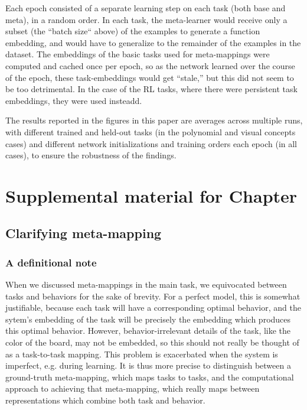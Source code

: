 Each epoch consisted of a separate learning step on each task (both base and meta), in a random order. In each task, the meta-learner would receive only a subset (the ``batch size`` above) of the examples to generate a function embedding, and would have to generalize to the remainder of the examples in the dataset. The embeddings of the basic tasks used for meta-mappings were computed and cached once per epoch, so as the network learned over the course of the epoch, these task-embeddings would get ``stale,'' but this did not seem to be too detrimental. In the case of the RL tasks, where there were persistent task embeddings, they were used insteadd.\par
The results reported in the figures in this paper are averages across multiple runs, with different trained and held-out tasks (in the polynomial and visual concepts cases) and different network initializations and training orders each epoch (in all cases), to ensure the robustness of the findings. \par



\chapter{Supplemental material for Chapter } \label{appendix:zero_shot_via_homm}

\section{Clarifying meta-mapping} \label{app_clarifying_meta_mapping}
\subsection{A definitional note}
When we discussed meta-mappings in the main task, we equivocated between tasks and behaviors for the sake of brevity. For a perfect model, this is somewhat justifiable, because each task will have a corresponding optimal behavior, and the sytem's embedding of the task will be precisely the embedding which produces this optimal behavior. However, behavior-irrelevant details of the task, like the color of the board, may not be embedded, so this should not really be thought of as a task-to-task mapping. This problem is exacerbated when the system is imperfect, e.g. during learning. It is thus more precise to distinguish between a ground-truth meta-mapping, which maps tasks to tasks, and the computational approach to achieving that meta-mapping, which really maps between representations which combine both task and behavior. \par

